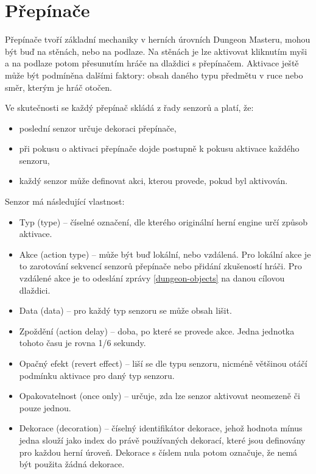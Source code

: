 \section{Přepínače}\label{actuator-analyza}
Přepínače tvoří základní mechaniky v herních úrovních Dungeon Masteru, mohou být buď na stěnách, nebo na podlaze. 
Na stěnách je lze aktivovat kliknutím myši a na podlaze potom přesunutím hráče na dlaždici s přepínačem. Aktivace ještě
může být podmíněna dalšími faktory: obsah daného typu předmětu v ruce nebo směr, kterým je hráč otočen.  

Ve skutečnosti se každý přepínač skládá z řady senzorů a platí, že:
\begin{itemize}
\item poslední senzor určuje dekoraci přepínače,
\item při pokusu o aktivaci přepínače dojde postupně k pokusu aktivace každého senzoru,
\item každý senzor může definovat akci, kterou provede, pokud byl aktivován.
\end{itemize}

Senzor má následující vlastnost:
\begin{itemize}
\item Typ (type) -- číselné označení, dle kterého originální herní engine určí způsob aktivace.
\item Akce (action type) -- může být buď lokální, nebo vzdálená. Pro lokální akce je to zarotování sekvencí senzorů 
	přepínače nebo přidání zkušeností hráči. Pro vzdálené akce je to odeslání zprávy \vref{dungeon-objects} na danou cílovou dlaždici. 
\item Data (data) -- pro každý typ senzoru se může obsah lišit.  
\item Zpoždění (action delay) -- doba, po které se provede akce. Jedna jednotka tohoto času je rovna 1/6 sekundy.
\item Opačný efekt (revert effect) -- liší se dle typu senzoru, nicméně většinou otáčí podmínku aktivace pro daný typ senzoru. 
\item Opakovatelnost (once only) -- určuje, zda lze senzor aktivovat neomezeně či pouze jednou.
\item Dekorace (decoration) -- číselný identifikátor dekorace, jehož hodnota mínus jedna slouží jako index 
do právě používaných dekorací, které jsou definovány pro každou herní úroveň. Dekorace s číslem nula 
potom označuje, že nemá být použita žádná dekorace. 

\end{itemize}

